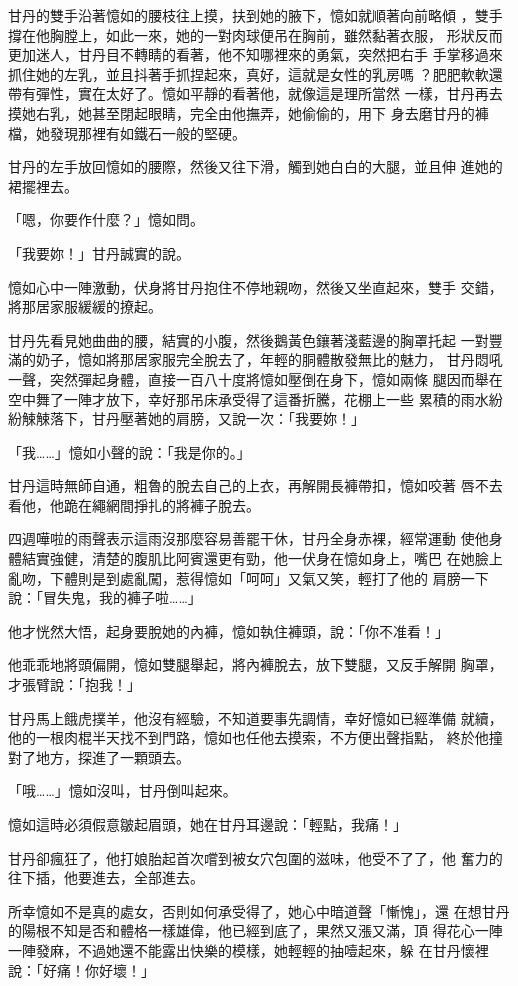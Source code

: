 甘丹的雙手沿著憶如的腰枝往上摸，扶到她的腋下，憶如就順著向前略傾
，雙手撐在他胸膛上，如此一來，她的一對肉球便吊在胸前，雖然黏著衣服，
形狀反而更加迷人，甘丹目不轉睛的看著，他不知哪裡來的勇氣，突然把右手
手掌移過來抓住她的左乳，並且抖著手抓捏起來，真好，這就是女性的乳房嗎
？肥肥軟軟還帶有彈性，實在太好了。憶如平靜的看著他，就像這是理所當然
一樣，甘丹再去摸她右乳，她甚至閉起眼睛，完全由他撫弄，她偷偷的，用下
身去磨甘丹的褲檔，她發現那裡有如鐵石一般的堅硬。

甘丹的左手放回憶如的腰際，然後又往下滑，觸到她白白的大腿，並且伸
進她的裙擺裡去。

「嗯，你要作什麼？」憶如問。

「我要妳！」甘丹誠實的說。

憶如心中一陣激動，伏身將甘丹抱住不停地親吻，然後又坐直起來，雙手
交錯，將那居家服緩緩的撩起。

甘丹先看見她曲曲的腰，結實的小腹，然後鵝黃色鑲著淺藍邊的胸罩托起
一對豐滿的奶子，憶如將那居家服完全脫去了，年輕的胴體散發無比的魅力，
甘丹悶吼一聲，突然彈起身體，直接一百八十度將憶如壓倒在身下，憶如兩條
腿因而舉在空中舞了一陣才放下，幸好那吊床承受得了這番折騰，花棚上一些
累積的雨水紛紛觫觫落下，甘丹壓著她的肩膀，又說一次：「我要妳！」

「我……」憶如小聲的說：「我是你的。」

甘丹這時無師自通，粗魯的脫去自己的上衣，再解開長褲帶扣，憶如咬著
唇不去看他，他跪在繩網間掙扎的將褲子脫去。

四週嘩啦的雨聲表示這雨沒那麼容易善罷干休，甘丹全身赤裸，經常運動
使他身體結實強健，清楚的腹肌比阿賓還更有勁，他一伏身在憶如身上，嘴巴
在她臉上亂吻，下體則是到處亂闖，惹得憶如「呵呵」又氣又笑，輕打了他的
肩膀一下說：「冒失鬼，我的褲子啦……」

他才恍然大悟，起身要脫她的內褲，憶如執住褲頭，說：「你不准看！」

他乖乖地將頭偏開，憶如雙腿舉起，將內褲脫去，放下雙腿，又反手解開
胸罩，才張臂說：「抱我！」

甘丹馬上餓虎撲羊，他沒有經驗，不知道要事先調情，幸好憶如已經準備
就續，他的一根肉棍半天找不到門路，憶如也任他去摸索，不方便出聲指點，
終於他撞對了地方，探進了一顆頭去。

「哦……」憶如沒叫，甘丹倒叫起來。

憶如這時必須假意皺起眉頭，她在甘丹耳邊說：「輕點，我痛！」

甘丹卻瘋狂了，他打娘胎起首次嚐到被女穴包圍的滋味，他受不了了，他
奮力的往下插，他要進去，全部進去。

所幸憶如不是真的處女，否則如何承受得了，她心中暗道聲「慚愧」，還
在想甘丹的陽根不知是否和體格一樣雄偉，他已經到底了，果然又漲又滿，頂
得花心一陣一陣發麻，不過她還不能露出快樂的模樣，她輕輕的抽噎起來，躲
在甘丹懷裡說：「好痛！你好壞！」

